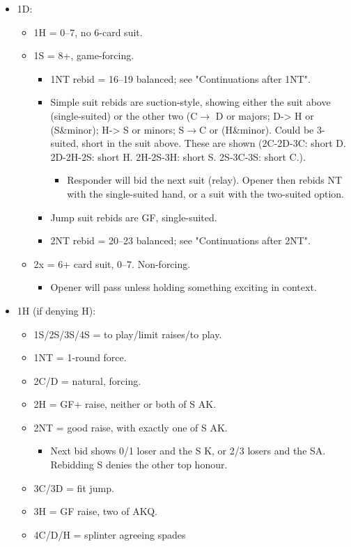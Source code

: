 \documentclass[a4paper,12pt]{article}
\begin{document}
\begin{itemize}
\item 1D:
	\begin{itemize}
   \item 1H = 0--7, no 6-card suit.
   \item 1S = 8+, game-forcing.
		\begin{itemize}
      \item 1NT rebid = 16--19 balanced; see "Continuations after 1NT".
      \item Simple suit rebids are suction-style, showing either the suit above
         (single-suited) or the other two (C$\rightarrow$ D or majors; D-> H or (S\&minor); H->
         S or minors; S$\rightarrow$C or (H\&minor). Could be 3-suited, short in the suit
         above. These are shown (2C-2D-3C: short D. 2D-2H-2S: short H. 2H-2S-3H:
         short S. 2S-3C-3S: short C.).
			\begin{itemize}
			\item Responder will bid the next suit (relay). Opener then rebids NT with the
				single-suited hand, or a suit with the two-suited option.
			\end{itemize}
      \item Jump suit rebids are GF, single-suited.
      \item 2NT rebid = 20--23 balanced; see "Continuations after 2NT".
		\end{itemize}
   \item 2x = 6+ card suit, 0--7. Non-forcing.
		\begin{itemize}
      \item Opener will pass unless holding something exciting in context.
		\end{itemize}
	\end{itemize}

\item 1H (if denying H):
	\begin{itemize}
   \item 1S/2S/3S/4S = to play/limit raises/to play.
   \item 1NT = 1-round force.
   \item 2C/D = natural, forcing.
   \item 2H = GF+ raise, neither or both of S AK.
   \item 2NT = good raise, with exactly one of S AK.
		\begin{itemize}
      \item Next bid shows 0/1 loser and the S K, or 2/3 losers and the SA.
         Rebidding S denies the other top honour.
		\end{itemize}
   \item 3C/3D = fit jump.
   \item 3H = GF raise, two of AKQ.
   \item 4C/D/H = splinter agreeing spades
	\end{itemize}


\end{itemize}
\end{document}
